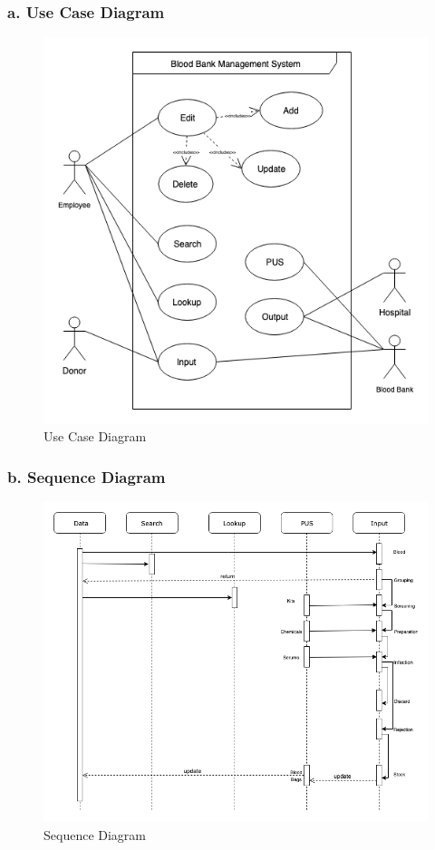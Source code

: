 \documentclass[BTech]{srmuthesis}
\begin{document}
\subsubsection{a. Use Case Diagram}
\begin{figure}[H]
	\centering
	\includegraphics[scale=0.7]{usecase.png}
	\caption{Use Case Diagram}
\end{figure}

\subsubsection{b. Sequence Diagram}
\begin{figure}[H]
	\centering
	\includegraphics[scale=0.6]{sequence.png}
	\caption{Sequence Diagram}
\end{figure}
\end{document}
